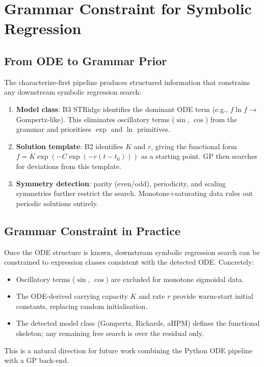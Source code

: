 \documentclass[11pt,a4paper]{article}
\begin{document}
\section{Grammar Constraint for Symbolic Regression}
\label{sec:discussion}

\subsection{From ODE to Grammar Prior}

The characterize-first pipeline produces structured information that constrains any
downstream symbolic regression search:

\begin{enumerate}
  \item \textbf{Model class}: B3 STRidge identifies the dominant ODE term
        (e.g., $f\ln f$ → Gompertz-like). This eliminates oscillatory terms ($\sin$, $\cos$)
        from the grammar and prioritises $\exp$ and $\ln$ primitives.

  \item \textbf{Solution template}: B2 identifies $K$ and $r$, giving the functional form
        $f = K\exp(-C\exp(-r(t-t_0)))$ as a starting point. GP then searches for deviations
        from this template.

  \item \textbf{Symmetry detection}: parity (even/odd), periodicity, and scaling
        symmetries further restrict the search. Monotone+saturating data rules out
        periodic solutions entirely.
\end{enumerate}

\subsection{Grammar Constraint in Practice}

Once the ODE structure is known, downstream symbolic regression search can be constrained
to expression classes consistent with the detected ODE. Concretely:
\begin{itemize}
  \item Oscillatory terms ($\sin$, $\cos$) are excluded for monotone sigmoidal data.
  \item The ODE-derived carrying capacity $K$ and rate $r$ provide warm-start initial
        constants, replacing random initialisation.
  \item The detected model class (Gompertz, Richards, aHPM) defines the functional
        skeleton; any remaining free search is over the residual only.
\end{itemize}
This is a natural direction for future work combining the Python ODE pipeline with a
GP back-end.
\end{document}
